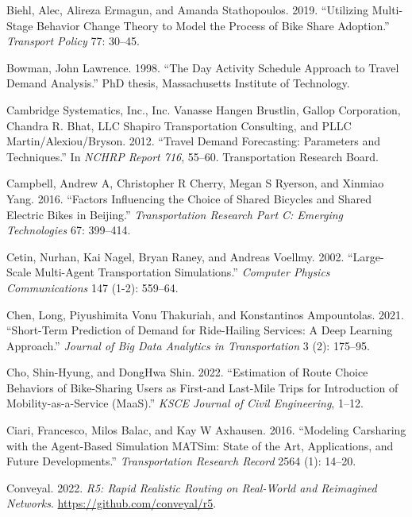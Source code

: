 \documentclass[12pt, oneside, openright]{byuthesis}
\newlength{\cslhangindent}
\newlength{\cslentryspacingunit} %
\newenvironment{CSLReferences}[2] %
 {%
  \setlength{\parindent}{0pt}
  \ifodd #1
  \let\oldpar\par
  \def\par{\hangindent=\cslhangindent\oldpar}
  \fi
  \setlength{\parskip}{#2\cslentryspacingunit}
 }%
 {}
\begin{document}
\begin{CSLReferences}{1}{0}
\leavevmode{}%
Biehl, Alec, Alireza Ermagun, and Amanda Stathopoulos. 2019. {``Utilizing Multi-Stage Behavior Change Theory to Model the Process of Bike Share Adoption.''} \emph{Transport Policy} 77: 30--45.

\leavevmode{}%
Bowman, John Lawrence. 1998. {``The Day Activity Schedule Approach to Travel Demand Analysis.''} PhD thesis, Massachusetts Institute of Technology.

\leavevmode{}%
Cambridge Systematics, Inc., Inc. Vanasse Hangen Brustlin, Gallop Corporation, Chandra R. Bhat, LLC Shapiro Transportation Consulting, and PLLC Martin/Alexiou/Bryson. 2012. {``Travel Demand Forecasting: Parameters and Techniques.''} In \emph{NCHRP Report 716}, 55--60. Transportation Research Board.

\leavevmode{}%
Campbell, Andrew A, Christopher R Cherry, Megan S Ryerson, and Xinmiao Yang. 2016. {``Factors Influencing the Choice of Shared Bicycles and Shared Electric Bikes in Beijing.''} \emph{Transportation Research Part C: Emerging Technologies} 67: 399--414.

\leavevmode{}%
Cetin, Nurhan, Kai Nagel, Bryan Raney, and Andreas Voellmy. 2002. {``Large-Scale Multi-Agent Transportation Simulations.''} \emph{Computer Physics Communications} 147 (1-2): 559--64.

\leavevmode{}%
Chen, Long, Piyushimita Vonu Thakuriah, and Konstantinos Ampountolas. 2021. {``Short-Term Prediction of Demand for Ride-Hailing Services: A Deep Learning Approach.''} \emph{Journal of Big Data Analytics in Transportation} 3 (2): 175--95.

\leavevmode{}%
Cho, Shin-Hyung, and DongHwa Shin. 2022. {``Estimation of Route Choice Behaviors of Bike-Sharing Users as First-and Last-Mile Trips for Introduction of Mobility-as-a-Service (MaaS).''} \emph{KSCE Journal of Civil Engineering}, 1--12.

\leavevmode{}%
Ciari, Francesco, Milos Balac, and Kay W Axhausen. 2016. {``Modeling Carsharing with the Agent-Based Simulation MATSim: State of the Art, Applications, and Future Developments.''} \emph{Transportation Research Record} 2564 (1): 14--20.

\leavevmode{}%
Conveyal. 2022. \emph{R5: Rapid Realistic Routing on Real-World and Reimagined Networks}. \url{https://github.com/conveyal/r5}.


\end{CSLReferences}
\end{document}
